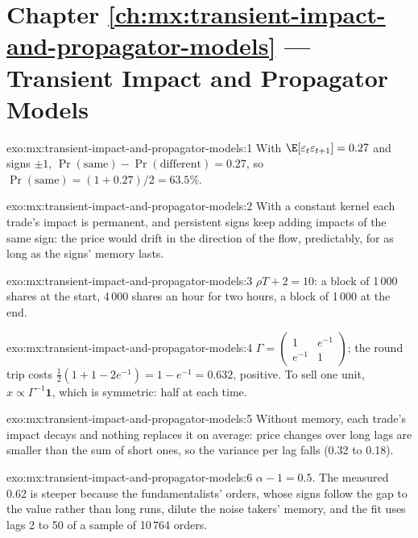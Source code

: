 \section*{Chapter \ref{ch:mx:transient-impact-and-propagator-models} --- Transient Impact and Propagator Models}

\begin{solution}{exo:mx:transient-impact-and-propagator-models:1}
With $\E[\varepsilon_t\varepsilon_{t+1}]=0.27$ and signs $\pm1$, $\Pr(\text{same})-\Pr(\text{different})=0.27$, so $\Pr(\text{same})=(1+0.27)/2=63.5\%$.
\end{solution}

\begin{solution}{exo:mx:transient-impact-and-propagator-models:2}
With a constant kernel each trade's impact is permanent, and persistent signs keep adding impacts of the same sign: the price would drift in the direction
of the flow, predictably, for as long as the signs' memory lasts.
\end{solution}

\begin{solution}{exo:mx:transient-impact-and-propagator-models:3}
$\rho T+2=10$: a block of 1\,000 shares at the start, 4\,000 shares an hour for two hours, a block of 1\,000 at the end.
\end{solution}

\begin{solution}{exo:mx:transient-impact-and-propagator-models:4}
$\Gamma=\begin{pmatrix}1&e^{-1}\\e^{-1}&1\end{pmatrix}$; the round trip costs $\tfrac12(1+1-2e^{-1})=1-e^{-1}=0.632$, positive. To sell one unit,
$x\propto\Gamma^{-1}\mathbf 1$, which is symmetric: half at each time.
\end{solution}

\begin{solution}{exo:mx:transient-impact-and-propagator-models:5}
Without memory, each trade's impact decays and nothing replaces it on average: price changes over long lags are smaller than the sum of short ones, so
the variance per lag falls (0.32 to 0.18).
\end{solution}

\begin{solution}{exo:mx:transient-impact-and-propagator-models:6}
$\alpha-1=0.5$. The measured 0.62 is steeper because the fundamentalists' orders, whose signs follow the gap to the value rather than long runs, dilute
the noise takers' memory, and the fit uses lags 2 to 50 of a sample of 10\,764 orders.
\end{solution}

